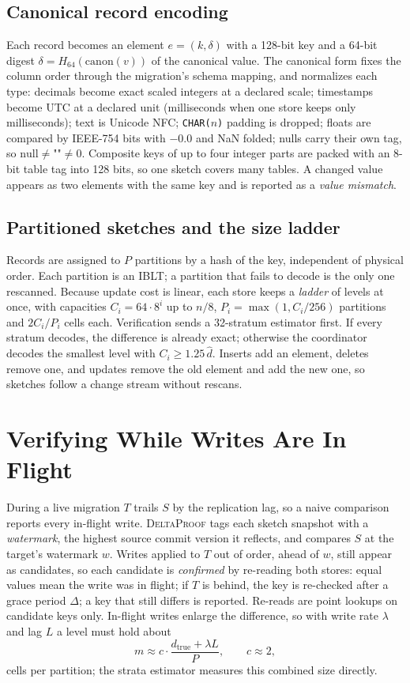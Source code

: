 \documentclass[conference]{IEEEtran}
\newcommand{\sys}{\textsc{DeltaProof}}
\begin{document}
\subsection{Canonical record encoding}\label{sec:canon}
Each record becomes an element $e=(k,\delta)$ with a 128-bit key and a 64-bit digest $\delta = H_{64}(\mathrm{canon}(v))$ of the canonical value. The canonical form fixes the column order through the migration's schema mapping, and normalizes each type: decimals become exact scaled integers at a declared scale; timestamps become UTC at a declared unit (milliseconds when one store keeps only milliseconds); text is Unicode NFC; \texttt{CHAR($n$)} padding is dropped; floats are compared by IEEE-754 bits with $-0.0$ and NaN folded; nulls carry their own tag, so $\mathrm{null}\neq\texttt{""}\neq 0$. Composite keys of up to four integer parts are packed with an 8-bit table tag into 128 bits, so one sketch covers many tables. A changed value appears as two elements with the same key and is reported as a \emph{value mismatch}.

\subsection{Partitioned sketches and the size ladder}
Records are assigned to $P$ partitions by a hash of the key, independent of physical order. Each partition is an IBLT; a partition that fails to decode is the only one rescanned. Because update cost is linear, each store keeps a \emph{ladder} of levels at once, with capacities $C_i = 64\cdot 8^i$ up to $n/8$, $P_i=\max(1, C_i/256)$ partitions and $2C_i/P_i$ cells each. Verification sends a 32-stratum estimator first. If every stratum decodes, the difference is already exact; otherwise the coordinator decodes the smallest level with $C_i \geq 1.25\,\hat d$. Inserts add an element, deletes remove one, and updates remove the old element and add the new one, so sketches follow a change stream without rescans.

\section{Verifying While Writes Are In Flight}\label{sec:live}
During a live migration $T$ trails $S$ by the replication lag, so a naive comparison reports every in-flight write. \sys{} tags each sketch snapshot with a \emph{watermark}, the highest source commit version it reflects, and compares $S$ at the target's watermark $w$. Writes applied to $T$ out of order, ahead of $w$, still appear as candidates, so each candidate is \emph{confirmed} by re-reading both stores: equal values mean the write was in flight; if $T$ is behind, the key is re-checked after a grace period $\Delta$; a key that still differs is reported. Re-reads are point lookups on candidate keys only. In-flight writes enlarge the difference, so with write rate $\lambda$ and lag $L$ a level must hold about
\begin{equation}
m \approx c\cdot \frac{d_{\mathrm{true}} + \lambda L}{P},\qquad c\approx 2,
\end{equation}
cells per partition; the strata estimator measures this combined size directly.
\end{document}
